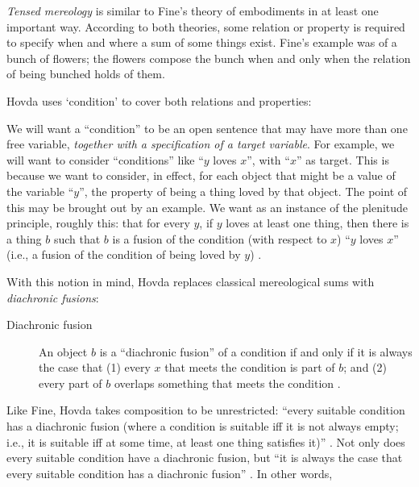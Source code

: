 \documentclass[11pt]{article}
\newenvironment{squote}{%
\begin{spacing}{1}
\begin{list}{}{%
\setlength{\labelwidth}{0pt}%
\rightmargin\leftmargin%
}
\item\relax
}{%
\end{list}%
\end{spacing}
}
\begin{document}
\begin{spacing}{1.5}
{\em Tensed mereology} is similar to Fine's theory of embodiments in
at least one important way.  According to both theories, some relation
or property is required to specify when and where a sum of some things
exist.  Fine's example was of a bunch of flowers; the flowers compose
the bunch when and only when the relation of being bunched holds of
them.

Hovda uses `condition' to cover both relations and properties:

\begin{squote}
We will want a ``condition'' to be an open sentence that may have more
than one free variable, \emph{together with a specification of a
  target variable}. For example, we will want to consider
``conditions'' like ``$y$ loves $x$'', with ``$x$'' as target.  This
is because we want to consider, in effect, for each object that might
be a value of the variable ``$y$'', the property of being a thing
loved by that object.  The point of this may be brought out by an
example.  We want as an instance of the plenitude principle, roughly
this: that for every $y$, if $y$ loves at least one thing, then there
is a thing $b$ such that $b$ is a fusion of the condition (with
respect to $x$) ``$y$ loves $x$'' (i.e., a fusion of the condition of
being loved by $y$) \citeyearpar[sec. 1.1n2]{hovda2011}.
\end{squote}

With this notion in mind, Hovda replaces classical mereological sums
with {\em diachronic fusions}:

\begin{description}
  \item[Diachronic fusion] An object $b$ is a ``diachronic fusion'' of
    a condition if and only if it is always the case that (1) every
    $x$ that meets the condition is part of $b$; and (2) every part of
    $b$ overlaps something that meets the condition
    \citeyearpar[sec. 1.1]{hovda2011}.
\end{description}

Like Fine, Hovda takes composition to be unrestricted: ``every
suitable condition has a diachronic fusion (where a condition is
suitable iff it is not always empty; i.e., it is suitable iff at some
time, at least one thing satisfies it)'' \citeyearpar[sec.
  3.1]{hovda2011}.  Not only does every suitable condition have a
diachronic fusion, but ``it is always the case that every suitable
condition has a diachronic fusion''
\citeyearpar[sec. 3.1.1]{hovda2011}.  In other words,


\end{spacing}
\end{document}
